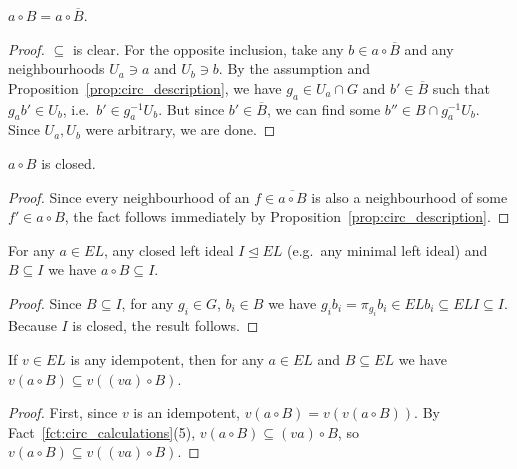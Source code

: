 	\begin{fct}
		\label{fct:circ_with_closure}
		$a\circ B=a\circ \overline B$.
	\end{fct}
	\begin{proof}
		$\subseteq$ is clear. For the opposite inclusion, take any $b\in a\circ \overline{B}$ and any neighbourhoods $U_a\ni a$ and $U_b\ni b$. By the assumption and Proposition~\ref{prop:circ_description}, we have $g_a\in U_a\cap G$ and $b'\in \overline{B}$ such that $g_ab'\in U_b$, i.e.\ $b'\in g_a^{-1}U_b$. But since $b'\in \overline{B}$, we can find some $b''\in B\cap g_a^{-1}U_b$. Since $U_a,U_b$ were arbitrary, we are done.
	\end{proof}
	
	\begin{fct}
		\label{fct:circ_closed}
		$a\circ B$ is closed.
	\end{fct}
	\begin{proof}
		Since every neighbourhood of an $f\in \overline{a\circ B}$ is also a neighbourhood of some $f'\in{a\circ B}$, the fact follows immediately by Proposition~\ref{prop:circ_description}.
	\end{proof}
	
	\begin{fct}
		\label{fct:circ_stays_in_ideal}
		For any $a\in EL$, any closed left ideal $I\unlhd EL$ (e.g.\ any minimal left ideal) and $B\subseteq I$ we have $a\circ B\subseteq I$.
	\end{fct}
	\begin{proof}
		Since $B\subseteq I$, for any $g_i\in G$, $b_i\in B$ we have $g_ib_i=\pi_{g_i}b_i\in ELb_i\subseteq ELI\subseteq I$. Because $I$ is closed, the result follows.
	\end{proof}
	
	\begin{fct}
		\label{fct:circ_with_idemp}
		If $v\in EL$ is any idempotent, then for any $a\in EL$ and $B\subseteq EL$ we have $v(a\circ B)\subseteq v((va)\circ B)$.
	\end{fct}
	\begin{proof}
		First, since $v$ is an idempotent, $v(a\circ B)=v(v(a\circ B))$. By Fact~\ref{fct:circ_calculations}(5), $v(a\circ B)\subseteq (va)\circ B$, so $v(a\circ B)\subseteq v((va)\circ B)$.
	\end{proof}
	
